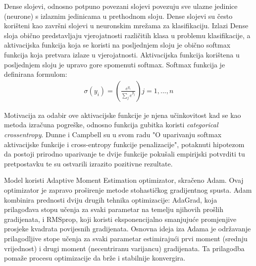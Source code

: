 \documentclass[times, utf8, zavrsni]{fer}
\begin{document}
Dense slojevi, odnosno potpuno povezani slojevi povezuju sve ulazne jedinice (neurone) s izlaznim jedinicama u prethodnom sloju.
Dense slojevi su često korišteni kao završni slojevi u neuronskim mrežama za klasifikaciju. Izlazi Dense sloja obično predstavljaju vjerojatnosti različitih klasa u problemu klasifikacije, a aktivacijska funkcija koja se koristi na posljednjem sloju je obično softmax funkcija koja pretvara izlaze u vjerojatnosti.
Aktivacijska funkcija korištena u posljednjem sloju je upravo gore spomenuti softmax.
Softmax funkcija je definirana formulom: 
\begin{eqnarray}
\sigma(y_{i}) = \left(\frac{e^{y_{i}}}{ \sum\limits_{j} e^{y_{j}}}\right)
j = 1,...,n
\end{eqnarray}

Motivacija za odabir ove aktivacijske funkcije je njena učinkovitost kad se kao metoda izračuna pogreške, odnosno funkcija gubitka koristi \emph{categorical crossentropy}. \citep{dunne1997pairing}
Dunne i Campbell su u svom radu "O uparivanju softmax aktivacijske funkcije i cross-entropy funkcije penalizacije", potaknuti hipotezom da postoji prirodno uparivanje te dvije funkcije pokušali empirijski potvrditi tu pretpostavku te su ostvarili izrazito pozitivne rezultate. 

Model koristi Adaptive Moment Estimation optimizator, skračeno Adam. Ovaj optimizator je zapravo proširenje metode stohastičkog gradijentnog spusta.
Adam kombinira prednosti dviju drugih tehnika optimizacije: AdaGrad, koja prilagođava stopu učenja za svaki parametar na temelju njihovih prošlih gradijenata, i RMSprop, koji koristi eksponencijalno smanjujuće promjenjive prosjeke kvadrata povijesnih gradijenata.
Osnovna ideja iza Adama je održavanje prilagodljive stope učenja za svaki parametar estimirajući prvi moment (srednju vrijednost) i drugi moment (necentriranu varijancu) gradijenata. Ta prilagodba pomaže procesu optimizacije da brže i stabilnije konvergira.\citep{kingma2014adam}
\end{document}
